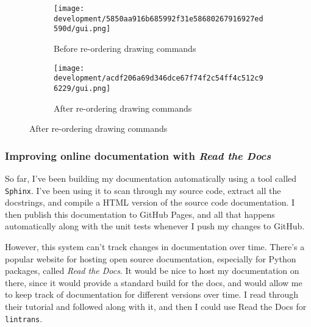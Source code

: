 \documentclass[../development.tex]{subfiles}
\begin{document}
\begin{figure}[H]
	\hspace{0.03\linewidth}
	\begin{minipage}{0.45\linewidth}
		\begin{figure}[H]
			\centering
			\texttt{[image: development/5850aa916b685992f31e58680267916927ed590d/gui.png]}
			\caption{Before re-ordering drawing commands}
			\label{fig:development:5850aa916b685992f31e58680267916927ed590d:gui.png}
		\end{figure}
	\end{minipage} \hfill
	\begin{minipage}{0.45\linewidth}
		\begin{figure}[H]
			\centering
			\texttt{[image: development/acdf206a69d346dce67f74f2c54ff4c512c96229/gui.png]}
			\caption{After re-ordering drawing commands}
			\label{fig:development:acdf206a69d346dce67f74f2c54ff4c512c96229:gui.png}
		\end{figure}
	\end{minipage}
	\hspace{0.03\linewidth}
\end{figure}

\subsubsection{Improving online documentation with \textit{Read the Docs}\label{development:making-v0.2.2:improving-online-documentation-with-read-the-docs}}

So far, I've been building my documentation automatically using a tool called \texttt{Sphinx}\cite{sphinx}. I've been using it to scan through my source code, extract all the docstrings\cite{pep257-docstring-conventions}, and compile a HTML version of the source code documentation. I then publish this documentation to GitHub Pages\cite{github-pages-docs}, and all that happens automatically along with the unit tests whenever I push my changes to GitHub.

However, this system can't track changes in documentation over time. There's a popular website for hosting open source documentation, especially for Python packages, called \textit{Read the Docs}\cite{readthedocs-homepage}. It would be nice to host my documentation on there, since it would provide a standard build for the docs, and would allow me to keep track of documentation for different versions over time. I read through their tutorial and followed along with it, and then I could use Read the Docs for \texttt{lintrans}.
\end{document}
